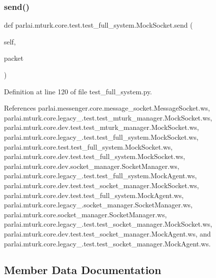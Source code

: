 \subsubsection{\texorpdfstring{send()}{send()}}
{\footnotesize\ttfamily def parlai.\+mturk.\+core.\+test.\+test\+\_\+full\+\_\+system.\+Mock\+Socket.\+send (\begin{DoxyParamCaption}\item[{}]{self,  }\item[{}]{packet }\end{DoxyParamCaption})}



Definition at line 120 of file test\+\_\+full\+\_\+system.\+py.



References parlai.\+messenger.\+core.\+message\+\_\+socket.\+Message\+Socket.\+ws, parlai.\+mturk.\+core.\+legacy\+\_.\+test.\+test\+\_\+mturk\+\_\+manager.\+Mock\+Socket.\+ws, parlai.\+mturk.\+core.\+dev.\+test.\+test\+\_\+mturk\+\_\+manager.\+Mock\+Socket.\+ws, parlai.\+mturk.\+core.\+legacy\+\_.\+test.\+test\+\_\+full\+\_\+system.\+Mock\+Socket.\+ws, parlai.\+mturk.\+core.\+test.\+test\+\_\+full\+\_\+system.\+Mock\+Socket.\+ws, parlai.\+mturk.\+core.\+dev.\+test.\+test\+\_\+full\+\_\+system.\+Mock\+Socket.\+ws, parlai.\+mturk.\+core.\+dev.\+socket\+\_\+manager.\+Socket\+Manager.\+ws, parlai.\+mturk.\+core.\+legacy\+\_.\+test.\+test\+\_\+full\+\_\+system.\+Mock\+Agent.\+ws, parlai.\+mturk.\+core.\+dev.\+test.\+test\+\_\+socket\+\_\+manager.\+Mock\+Socket.\+ws, parlai.\+mturk.\+core.\+dev.\+test.\+test\+\_\+full\+\_\+system.\+Mock\+Agent.\+ws, parlai.\+mturk.\+core.\+legacy\+\_.\+socket\+\_\+manager.\+Socket\+Manager.\+ws, parlai.\+mturk.\+core.\+socket\+\_\+manager.\+Socket\+Manager.\+ws, parlai.\+mturk.\+core.\+legacy\+\_.\+test.\+test\+\_\+socket\+\_\+manager.\+Mock\+Socket.\+ws, parlai.\+mturk.\+core.\+dev.\+test.\+test\+\_\+socket\+\_\+manager.\+Mock\+Agent.\+ws, and parlai.\+mturk.\+core.\+legacy\+\_.\+test.\+test\+\_\+socket\+\_\+manager.\+Mock\+Agent.\+ws.



\subsection{Member Data Documentation}
\mbox{\label{classparlai_1_1mturk_1_1core_1_1test_1_1test__full__system_1_1MockSocket_abc6460e0ba4ef0c849408f4403206a1d}} 
